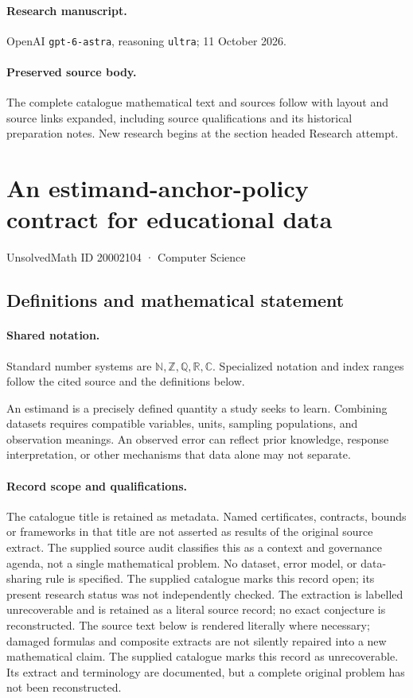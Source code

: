 \documentclass[11pt]{article}
\begin{document}
\paragraph{Research manuscript.} OpenAI \texttt{gpt-6-astra}, reasoning \texttt{ultra}; 11 October 2026.
\paragraph{Preserved source body.} The complete catalogue mathematical text and sources follow with layout and source links expanded, including source qualifications and its historical preparation notes. New research begins at the section headed Research attempt.

\section{An estimand-anchor-policy contract for educational data}\label{20002104}
{\small UnsolvedMath ID 20002104 · Computer Science}
\subsection{Definitions and mathematical statement}

\paragraph{Shared notation.}Standard number systems are $\mathbb N,\mathbb Z,\mathbb Q,\mathbb R,\mathbb C$. Specialized notation and index ranges follow the cited source and the definitions below.


An estimand is a precisely defined quantity a study seeks to learn. Combining datasets requires compatible variables, units, sampling populations, and observation meanings. An observed error can reflect prior knowledge, response interpretation, or other mechanisms that data alone may not separate.
\paragraph{Record scope and qualifications.}
The catalogue title is retained as metadata. Named certificates, contracts, bounds or frameworks in that title are not asserted as results of the original source extract.
The supplied source audit classifies this as a context and governance agenda, not a single mathematical problem. No dataset, error model, or data-sharing rule is specified. The supplied catalogue marks this record open; its present research status was not independently checked. The extraction is labelled unrecoverable and is retained as a literal source record; no exact conjecture is reconstructed.
The source text below is rendered literally where necessary; damaged formulas and composite extracts are not silently repaired into a new mathematical claim.
The supplied catalogue marks this record as unrecoverable. Its extract and terminology are documented, but a complete original problem has not been reconstructed.
\end{document}
